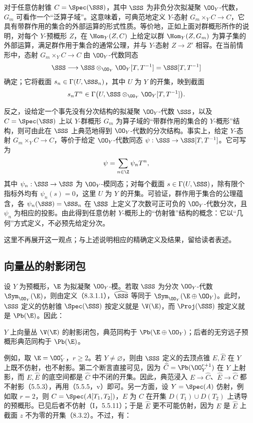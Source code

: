 对于任意仿射锥 $C=\Spec(\SSS)$，其中 $\SSS$ 为非负分次拟凝聚 $\OO_Y$-代数，$G_m$ 可看作一个“泛算子域”。这意味着，可典范地定义 $Y$-态射 $G_m\times_Y C\to C$，它具有带群作用的集合的外部运算的形式性质。等价地，正如上面对群概形所作的说明，对每个 $Y$-预概形 $Z$，在 $\Hom_Y(Z,C)$ 上给定以群 $\Hom_Y(Z,G_m)$ 为算子集的外部运算，满足群作用于集合的通常公理，并与 $Y$-态射 $Z\to Z'$ 相容。在当前情形中，态射 $G_m\times_YC\to C$ 由 $\OO_Y$-代数同态
\[
\SSS\longrightarrow\SSS\otimes_{\OO_Y}\OO_Y[T,T^{-1}]=\SSS[T,T^{-1}]
\]
确定；它将截面 $s_n\in\Gamma(U,\SSS_n)$，其中 $U$ 为 $Y$ 的开集，映到截面
\[
s_nT^n\in\Gamma\bigl(U,\SSS\otimes_{\OO_Y}\OO_Y[T,T^{-1}]\bigr).
\]

反之，设给定一个事先没有分次结构的拟凝聚 $\OO_Y$-代数 $\SSS$，以及 $C=\Spec(\SSS)$ 上以 $Y$-群概形 $G_m$ 为算子域的“带群作用的集合的 $Y$-概形”结构，则可由此在 $\SSS$ 上典范地得到 $\OO_Y$-代数的分次结构。事实上，给定 $Y$-态射 $G_m\times_YC\to C$，等价于给定 $\OO_Y$-代数同态 $\psi:\SSS\to\SSS[T,T^{-1}]$。它可写为
\[
\psi=\sum_{n\in\Z}\psi_nT^n,
\]
其中 $\psi_n:\SSS\to\SSS$ 为 $\OO_Y$-模同态；对每个截面 $s\in\Gamma(U,\SSS)$，除有限个指标外均有 $\psi_n(s)=0$，这里 $U$ 为 $Y$ 的开集。可验证，群作用于集合的公理蕴含，各 $\psi_n(\SSS)=\SSS_n$ 在 $\SSS$ 上定义了次数可正可负的 $\OO_Y$-代数分次，且 $\psi_n$ 为相应的投影。由此得到任意仿射 $Y$-概形上的“仿射锥”结构的概念：它以“几何”方式定义，不必预先给定分次。

这里不再展开这一观点；与上述说明相应的精确定义及结果，留给读者表述。

\subsection{向量丛的射影闭包}
设 $Y$ 为预概形，$\E$ 为拟凝聚 $\OO_Y$-模。若取 $\SSS$ 为分次 $\OO_Y$-代数 $\Sym_{\OO_Y}(\E)$，则由定义（8.3.1.1），$\widehat{\SSS}$ 等同于 $\Sym_{\OO_Y}(\E\oplus\OO_Y)$。此时，$\SSS$ 定义的仿射锥 $\Spec(\SSS)$ 按定义就是 $\V(\E)$，而 $\Proj(\SSS)$ 按定义就是 $\Pb(\E)$。因此：

$Y$ 上向量丛 $\V(\E)$ 的射影闭包，典范同构于 $\Pb(\E\oplus\OO_Y)$；后者的无穷远子预概形典范同构于 $\Pb(\E)$。

例如，取 $\E=\OO_Y^r$，$r\geq2$。若 $Y\ne\varnothing$，则由 $\SSS$ 定义的去顶点锥 $E,\widehat E$ 在 $Y$ 上既不仿射，也不射影。第二个断言直接可见，因为 $\widehat C=\Pb(\OO_Y^{r+1})$ 在 $Y$ 上射影，而 $E,\widehat E$ 的底空间都是 $\widehat C$ 中不闭的开集。因此，典范浸入 $E\to\widehat C$、$\widehat E\to\widehat C$ 都不射影（5.5.3），再用（5.5.5，v）即可。另一方面，设 $Y=\Spec(A)$ 仿射，例如取 $r=2$，则 $C=\Spec(A[T_1,T_2])$，$E$ 为 $C$ 在开集 $D(T_1)\cup D(T_2)$ 上诱导的预概形。已见后者不仿射（I，5.5.11）；于是 $\widehat E$ 更不可能仿射，因为 $E$ 是 $\widehat E$ 上截面 $z$ 不为零的开集（8.3.2）。不过，有：

